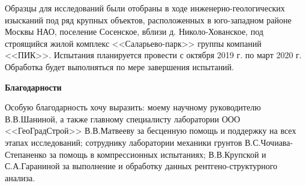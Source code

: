 
Образцы для исследований были отобраны в ходе инженерно-геологических изысканий под ряд крупных объектов, расположенных в юго-западном районе Москвы НАО, поселение Сосенское, вблизи д. Николо-Хованское, под строящийся жилой комплекс <<Саларьево-парк>> группы компаний <<ПИК>>. Испытания планируется провести с октября 2019 г. по март 2020 г. Обработка будет выполняться по мере завершения испытаний.
 

\textbf{Благодарности}

Особую благодарность хочу выразить: моему научному руководителю В.\;В.\;Шаниной, а также главному специалисту лаборатории ООО <<ГеоГрадСтрой>> В.\;В.\;Матвееву за бесценную помощь и поддержку на всех этапах исследований; сотруднику лаборатории механики грунтов В.\;С.\;Чочиава-Степаненко за помощь в компрессионных испытаниях; В.\;В.\;Крупской и С.\;А.\;Гараниной за выполнение и обработку данных рентгено-структурного анализа.
